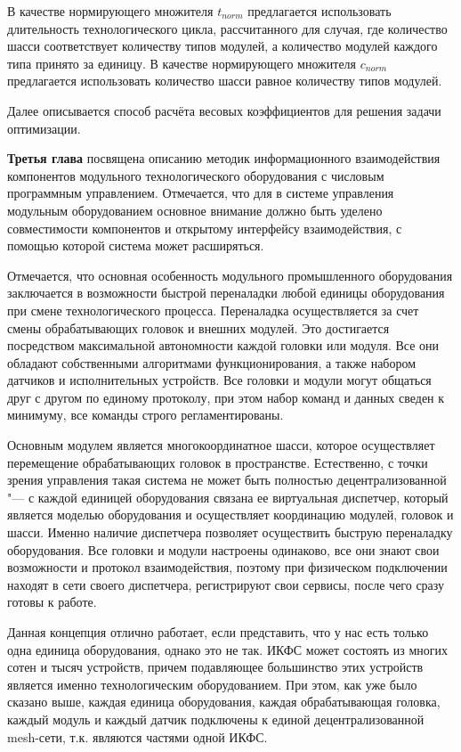В качестве нормирующего множителя $t_{norm}$ предлагается использовать длительность технологического цикла, рассчитанного для случая, где количество шасси соответствует количеству типов модулей, а количество модулей каждого типа принято за единицу. В качестве нормирующего множителя $c_{norm}$ предлагается использовать количество шасси равное количеству типов модулей. 

Далее описывается способ расчёта весовых коэффициентов для решения задачи оптимизации.

\textbf{Третья глава} посвящена описанию методик информационного взаимодействия компонентов модульного технологического оборудования с числовым программным управлением. Отмечается, что для в системе управления модульным оборудованием основное внимание должно быть уделено совместимости компонентов и открытому интерфейсу взаимодействия, с помощью которой система может расширяться. 

Отмечается, что основная особенность модульного промышленного оборудования заключается в возможности быстрой переналадки любой единицы оборудования при смене технологического процесса. Переналадка осуществляется за счет смены обрабатывающих головок и внешних модулей.  Это достигается посредством максимальной автономности каждой головки или модуля. Все они обладают собственными алгоритмами функционирования, а также набором датчиков и исполнительных устройств. Все головки и модули могут общаться друг с другом по единому протоколу, при этом набор команд и данных сведен к минимуму, все команды строго регламентированы.

Основным модулем является многокоординатное шасси, которое осуществляет перемещение обрабатывающих головок в пространстве. Естественно, с точки зрения управления такая система не может быть полностью децентрализованной "--- с каждой единицей оборудования связана ее виртуальная диспетчер, который является моделью оборудования и осуществляет координацию модулей, головок и шасси. Именно наличие диспетчера позволяет осуществить быструю переналадку оборудования. Все головки и модули настроены одинаково, все они знают свои возможности и протокол взаимодействия, поэтому при физическом подключении находят в сети своего диспетчера, регистрируют свои сервисы, после чего сразу готовы к работе.

Данная концепция отлично работает, если представить, что у нас есть только одна единица оборудования, однако это не так. ИКФС может состоять из многих сотен и тысяч устройств, причем подавляющее большинство этих устройств является именно технологическим оборудованием. При этом, как уже было сказано выше, каждая единица оборудования, каждая обрабатывающая головка, каждый модуль и каждый датчик подключены к единой децентрализованной mesh-сети, т.\:к. являются частями одной ИКФС.

